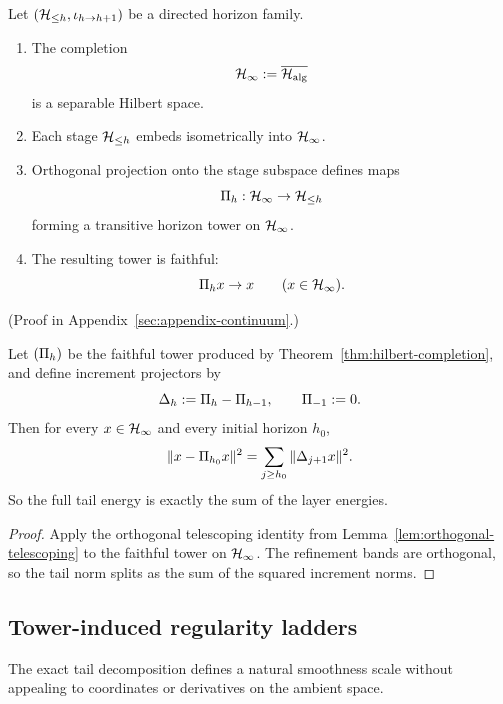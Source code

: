 \begin{theorem}
\label{thm:hilbert-completion}
Let $(\mathcal{H}_{\le h},\iota_{h\to h+1})$ be a directed horizon family.
\begin{enumerate}[label=(\roman*), leftmargin=2em, itemsep=0.2em]
\item The completion
      \[
      \mathcal{H}_\infty:=\overline{\mathcal{H}_{\mathrm{alg}}}
      \]
      is a separable Hilbert space.
\item Each stage $\mathcal{H}_{\le h}$ embeds isometrically into $\mathcal{H}_\infty$.
\item Orthogonal projection onto the stage subspace defines maps
      \[
      \Pi_{h}:\mathcal{H}_\infty\to \mathcal{H}_{\le h}
      \]
      forming a transitive horizon tower on $\mathcal{H}_\infty$.
\item The resulting tower is faithful:
      \[
      \Pi_{h}x\to x
      \qquad(x\in\mathcal{H}_\infty).
      \]
\end{enumerate}
\end{theorem}

(Proof in Appendix~\ref{sec:appendix-continuum}.)

\begin{corollary}
\label{cor:horizon-error-budget}
Let $(\Pi_{h})$ be the faithful tower produced by
Theorem~\ref{thm:hilbert-completion}, and define increment projectors by
\[
\Delta_{h}:=\Pi_{h}-\Pi_{h-1},
\qquad
\Pi_{-1}:=0.
\]
Then for every $x\in\mathcal{H}_\infty$ and every initial horizon $h_0$,
\[
\|x-\Pi_{h_0}x\|^2
=
\sum_{j\ge h_0}\|\Delta_{j+1}x\|^2.
\]
So the full tail energy is exactly the sum of the layer energies.
\end{corollary}

\begin{proof}
Apply the orthogonal telescoping identity from
Lemma~\ref{lem:orthogonal-telescoping} to the faithful tower on $\mathcal{H}_\infty$.
The refinement bands are orthogonal, so the tail norm splits as the sum of the
squared increment norms.
\end{proof}

\subsection{Tower-induced regularity ladders}

The exact tail decomposition defines a natural smoothness scale without
appealing to coordinates or derivatives on the ambient space.

